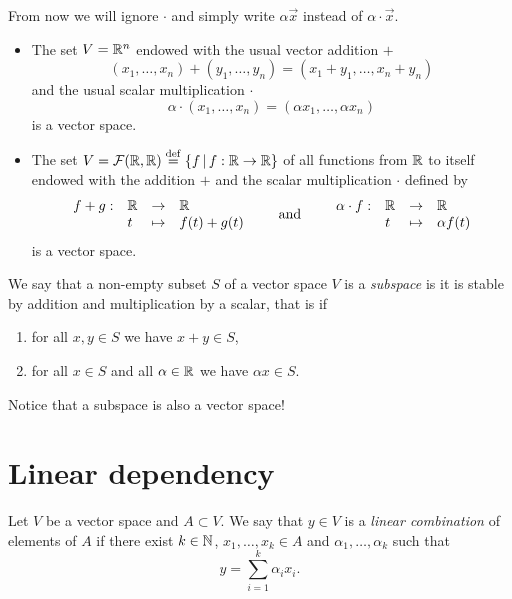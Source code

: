 \documentclass[11pt,nocut]{article}
\begin{document}
From now we will ignore $\cdot$ and simply write $\alpha \vec{x}$ instead of $\alpha \cdot \vec{x}$.

\begin{example}
	\leavevmode
	\begin{itemize}
		\item The set $V = \mathbb{R}^n$ endowed with the usual vector addition $+$
			$$
			(x_1, \dots, x_n) + (y_1, \dots, y_n) = (x_1 + y_1, \dots, x_n + y_n)
			$$
			and the usual scalar multiplication $\cdot$
			$$
			\alpha \cdot (x_1, \dots, x_n)= (\alpha x_1, \dots, \alpha x_n)
			$$
			is a vector space.
		\item The set $V = \mathcal{F}(\mathbb{R},\mathbb{R}) \overset{\rm def}{=} \{ f \, | \, f: \mathbb{R} \to \mathbb{R} \}$ of all functions from $\mathbb{R}$ to itself endowed with the addition $+$ and the scalar multiplication $\cdot$ defined by
			$$
			\begin{array}{rlll}
			f+g :& \mathbb{R} & \to & \mathbb{R} \\
				 &t & \mapsto & f(t) + g(t)
			\end{array}
			\qquad
			\text{and}
			\qquad
			\begin{array}{rlll}
			\alpha \cdot f :& \mathbb{R} & \to & \mathbb{R} \\
							&t & \mapsto & \alpha f(t)
			\end{array}
			$$
			is a vector space.
	\end{itemize}
\end{example}

\begin{definition}[Subspace]
	We say that a non-empty subset $S$ of a vector space $V$ is a \emph{subspace} is it is stable by addition and multiplication by a scalar, that is if
	\begin{enumerate}[label=(\roman*),noitemsep]
		\item for all $x,y \in S$ we have $x + y \in S$,
		\item for all $x \in S$ and all $\alpha \in \mathbb{R}$ we have $\alpha x \in S$.
	\end{enumerate}
\end{definition}

Notice that a subspace is also a vector space!

\section{Linear dependency}

\begin{definition}
	Let $V$ be a vector space and $A \subset V$. We say that $y \in V$ is a \emph{linear combination} of elements of $A$ if there exist $k \in \mathbb{N}$, $x_1, \dots, x_k \in A$ and $\alpha_1, \dots, \alpha_k$ such that
	$$
	y = \sum_{i=1}^k \alpha_i x_i.
	$$
\end{definition}
\end{document}
